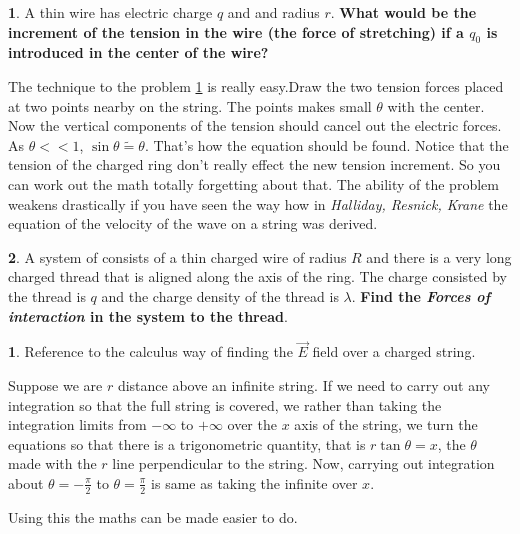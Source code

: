 \documentclass[11pt,a4paper,landscape,twocolumn]{article}
\theoremstyle{definition}
\newtheorem{fct}{ \framebox[0.05\textwidth]{{\sffamily Fact}} }
\theoremstyle{definition}
\newtheorem{pr}{ \framebox[0.05\textwidth]{{\sffamily Pr}} }
\theoremstyle{definition}
\theoremstyle{definition}
\begin{document}
\begin{pr} \label{pr2}
A thin wire has electric charge $q$ and and radius $r$. \textbf{What would be the increment of the tension in the wire (the force of stretching) if a $q_0$ is introduced in the center of the wire?}
\end{pr}

{\small The technique to the problem \ref{pr2} is really easy.Draw the two tension forces placed at two points nearby on the string. The points makes small $\theta$ with the center. Now the vertical components of the tension should cancel out the electric forces. As $\theta << 1$, $\sin \theta \tilde{=} \theta $. That's how the equation should be found. Notice that the tension of the charged ring don't really effect the new tension increment. So you can work out the math totally forgetting about that. The ability of the problem weakens drastically if you have seen the way how in \emph{Halliday, Resnick, Krane} the equation of the velocity of the wave on a string was derived.}


\begin{pr} \label{pr3}
A system of consists of a thin charged wire of radius $R$ and there is a very long charged thread that is aligned along the axis of the ring. The charge consisted by the thread is $q$ and the charge density of the thread is $\lambda$. \textbf{Find the \emph{Forces of interaction} in the system to the thread}.
\end{pr}

\begin{fct}
Reference to the calculus way of finding the $\vec{E}$ field over a charged string.


Suppose we are $r$ distance above an infinite string. If we need to carry out any integration so that the full string is covered, we rather than taking the integration limits from $- \infty$ to $ + \infty$ over the $x$ axis of the string, we turn the equations so that there is a trigonometric quantity, that is $r \tan \theta = x $, the $\theta$ made with the $r$ line perpendicular to the string. Now, carrying out integration about $ \theta = -\frac{ \pi }{2 } $ to $ \theta = \frac{\pi}{2} $ is same as taking the infinite over $x$. 
\end{fct}

Using this the maths can be made easier to do.
 
\end{document}
